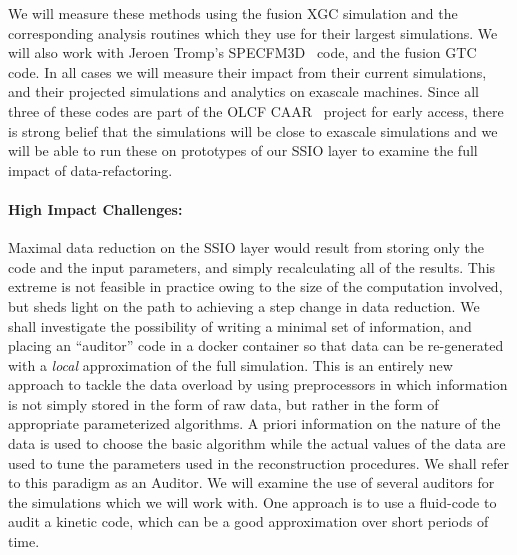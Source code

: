 We will measure these methods using the fusion XGC simulation and the
corresponding analysis routines which they use for their largest simulations.
We will also work with Jeroen Tromp's SPECFM3D~\cite{SPECFEM3D} code, and the
fusion GTC~\cite{klasky2003grid} code.  In all cases we will measure their
impact from their current simulations, and their projected simulations and
analytics on exascale machines. Since all three of these codes are part of the
OLCF CAAR~\cite{CAAR} project for early access, there is strong belief that the
simulations will be close to exascale simulations and we will be able to run
these on prototypes of our SSIO layer to examine the full impact of
data-refactoring.

\paragraph{High Impact Challenges:} Maximal data reduction on the SSIO layer
would result from storing only the code and the input parameters, and simply
recalculating all of the results. This extreme is not feasible in practice
owing to the size of the computation involved, but sheds light on the path to
achieving a step change in data reduction. We shall investigate the possibility
of writing a minimal set of information, and placing an ``auditor'' code in a
docker container so that data can be re-generated with a {\em local}
approximation of the full simulation. This is an entirely new approach to
tackle the data overload by using preprocessors in which information is not
simply stored in the form of raw data, but rather in the form of appropriate
parameterized algorithms. A priori information on the nature of the data is
used to choose the basic algorithm while the actual values of the data are used
to tune the parameters used in the reconstruction procedures. We shall refer to
this paradigm as an Auditor.  We will examine the use of several auditors for
the simulations which we will work with. One approach is to use a fluid-code to
audit a kinetic code, which can be a good approximation over short periods of
time. 

